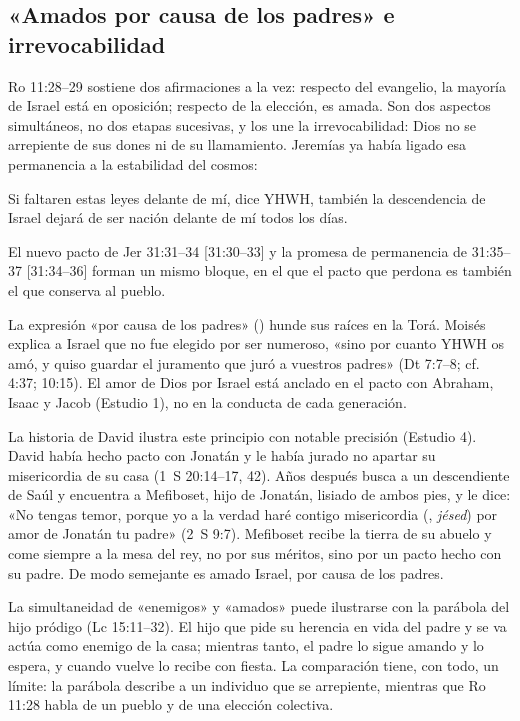 \subsection{«Amados por causa de los padres» e irrevocabilidad}
Ro 11:28--29 sostiene dos afirmaciones a la vez: respecto del evangelio, la mayoría de Israel está en oposición; respecto de la elección, es amada. Son dos aspectos simultáneos, no dos etapas sucesivas, y los une la irrevocabilidad: Dios no se arrepiente de sus dones ni de su llamamiento. Jeremías ya había ligado esa permanencia a la estabilidad del cosmos:
\begin{cita}Si faltaren estas leyes delante de mí, dice YHWH, también la descendencia de Israel dejará de ser nación delante de mí todos los días.\end{cita}
El nuevo pacto de Jer 31:31--34 [31:30--33] y la promesa de permanencia de 31:35--37 [31:34--36] forman un mismo bloque, en el que el pacto que perdona es también el que conserva al pueblo.

La expresión «por causa de los padres» () hunde sus raíces en la Torá. Moisés explica a Israel que no fue elegido por ser numeroso, «sino por cuanto YHWH os amó, y quiso guardar el juramento que juró a vuestros padres» (Dt 7:7--8; cf. 4:37; 10:15). El amor de Dios por Israel está anclado en el pacto con Abraham, Isaac y Jacob (Estudio 1), no en la conducta de cada generación.

La historia de David ilustra este principio con notable precisión (Estudio 4). David había hecho pacto con Jonatán y le había jurado no apartar su misericordia de su casa (1~S 20:14--17, 42). Años después busca a un descendiente de Saúl y encuentra a Mefiboset, hijo de Jonatán, lisiado de ambos pies, y le dice: «No tengas temor, porque yo a la verdad haré contigo misericordia (, \emph{jésed}) por amor de Jonatán tu padre» (2~S 9:7). Mefiboset recibe la tierra de su abuelo y come siempre a la mesa del rey, no por sus méritos, sino por un pacto hecho con su padre. De modo semejante es amado Israel, por causa de los padres.

La simultaneidad de «enemigos» y «amados» puede ilustrarse con la parábola del hijo pródigo (Lc 15:11--32). El hijo que pide su herencia en vida del padre y se va actúa como enemigo de la casa; mientras tanto, el padre lo sigue amando y lo espera, y cuando vuelve lo recibe con fiesta. La comparación tiene, con todo, un límite: la parábola describe a un individuo que se arrepiente, mientras que Ro 11:28 habla de un pueblo y de una elección colectiva.

